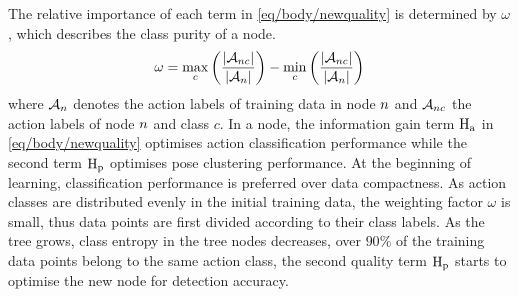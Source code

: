 The relative importance of each term in \ref{eq/body/newquality} is determined by $\omega$, which describes the class purity of a node. 
\begin{equation}
	\omega = \max_{c}\left( \frac{|\mathcal{A}_{n c}|}{|\mathcal{A}_{n}|}\right)- \min_{c} \left(\frac{|\mathcal{A}_{n c}|}{| \mathcal{A}_{n}|}\right)
\end{equation} 
where $\mathcal{A}_{n}$ denotes the action labels of training data in node $n$ and $\mathcal{A}_{n c}$ the action labels of node $n$ and class $c$.  
In a node, the information gain term $\mathrm{H_{a}}$ in \ref{eq/body/newquality} optimises action classification performance while the second term $\mathrm{H_{p}}$ optimises pose clustering performance. 
At the beginning of learning, classification performance is preferred over data compactness. As action classes are distributed evenly in the initial training data, the weighting factor $\omega$ is small, thus data points are first divided according to their class labels. As the tree grows, class entropy in the tree nodes decreases, \eg over $90\%$ of the training data points belong to the same action class, the second quality term $\mathrm{H_{p}}$ starts to optimise the new node for detection accuracy.  


